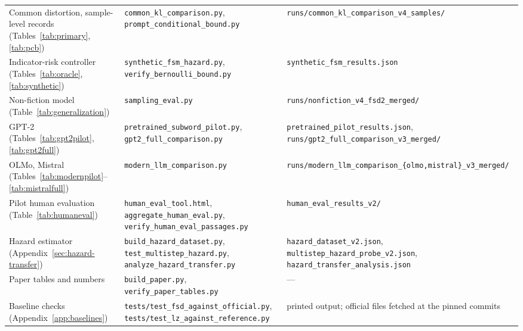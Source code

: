 \begin{table}[H]
\begin{tabular}{@{}p{}p{}p{}@{}}
Common distortion, sample-level records (Tables~\ref{tab:primary}, \ref{tab:pcb}) & \texttt{common\_\allowbreak{}kl\_\allowbreak{}comparison.py}, \texttt{prompt\_\allowbreak{}conditional\_\allowbreak{}bound.py} & \texttt{runs/common\_\allowbreak{}kl\_\allowbreak{}comparison\_\allowbreak{}v4\_\allowbreak{}samples/} \\
Indicator-risk controller (Tables~\ref{tab:oracle}, \ref{tab:synthetic}) & \texttt{synthetic\_\allowbreak{}fsm\_\allowbreak{}hazard.py}, \texttt{verify\_\allowbreak{}bernoulli\_\allowbreak{}bound.py} & \texttt{synthetic\_\allowbreak{}fsm\_\allowbreak{}results.json} \\
Non-fiction model (Table~\ref{tab:generalization}) & \texttt{sampling\_\allowbreak{}eval.py} & \texttt{runs/nonfiction\_\allowbreak{}v4\_\allowbreak{}fsd2\_\allowbreak{}merged/} \\
GPT-2 (Tables~\ref{tab:gpt2pilot}, \ref{tab:gpt2full}) & \texttt{pretrained\_\allowbreak{}subword\_\allowbreak{}pilot.py}, \texttt{gpt2\_\allowbreak{}full\_\allowbreak{}comparison.py} & \texttt{pretrained\_\allowbreak{}pilot\_\allowbreak{}results.json}, \texttt{runs/gpt2\_\allowbreak{}full\_\allowbreak{}comparison\_\allowbreak{}v3\_\allowbreak{}merged/} \\
OLMo, Mistral (Tables~\ref{tab:modernpilot}--\ref{tab:mistralfull}) & \texttt{modern\_\allowbreak{}llm\_\allowbreak{}comparison.py} & \texttt{runs/modern\_\allowbreak{}llm\_\allowbreak{}comparison\_\allowbreak{}\{olmo,mistral\}\_\allowbreak{}v3\_\allowbreak{}merged/} \\
Pilot human evaluation (Table~\ref{tab:humaneval}) & \texttt{human\_\allowbreak{}eval\_\allowbreak{}tool.html}, \texttt{aggregate\_\allowbreak{}human\_\allowbreak{}eval.py}, \texttt{verify\_\allowbreak{}human\_\allowbreak{}eval\_\allowbreak{}passages.py} & \texttt{human\_\allowbreak{}eval\_\allowbreak{}results\_\allowbreak{}v2/} \\
Hazard estimator (Appendix~\ref{sec:hazard-transfer}) & \texttt{build\_\allowbreak{}hazard\_\allowbreak{}dataset.py}, \texttt{test\_\allowbreak{}multistep\_\allowbreak{}hazard.py}, \texttt{analyze\_\allowbreak{}hazard\_\allowbreak{}transfer.py} & \texttt{hazard\_\allowbreak{}dataset\_\allowbreak{}v2.json}, \texttt{multistep\_\allowbreak{}hazard\_\allowbreak{}probe\_\allowbreak{}v2.json}, \texttt{hazard\_\allowbreak{}transfer\_\allowbreak{}analysis.json} \\
Paper tables and numbers & \texttt{build\_\allowbreak{}paper.py}, \texttt{verify\_\allowbreak{}paper\_\allowbreak{}tables.py} & --- \\
Baseline checks (Appendix~\ref{app:baselines}) & \texttt{tests/test\_\allowbreak{}fsd\_\allowbreak{}against\_\allowbreak{}official.py}, \texttt{tests/test\_\allowbreak{}lz\_\allowbreak{}against\_\allowbreak{}reference.py} & printed output; official files fetched at the pinned commits \\
\bottomrule
\end{tabular}
\end{table}

